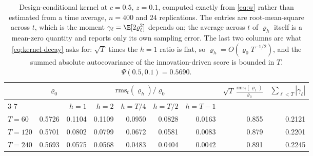 \begin{table}[htbp]
\centering
\caption{Design-conditional kernel at $c=0.5$, $z=0.1$, computed exactly from
\eqref{eq:w} rather than estimated from a time average, $n=400$ and $24$
replications. The entries are root-mean-square across $t$, which is the moment
$\gamma_\ell=\E[2\varrho_\ell^2]$ depends on; the average across $t$ of
$\varrho_h$ itself is a mean-zero quantity and reports only its own sampling
error. The last two columns are what \eqref{eq:kernel-decay} asks for:
$\sqrt T$ times the $h=1$ ratio is flat, so $\varrho_h=O(\varrho_0T^{-1/2})$,
and the summed absolute autocovariance of the innovation-driven score is
bounded in $T$. $\Psi(0.5,0.1)=0.5690$.}
\label{tab:kernel-check}
\small
\begin{tabular}{lrrrrrr@{\qquad}rr}
\toprule
& $\varrho_0$ & \multicolumn{5}{c}{$\mathrm{rms}_t(\varrho_h)/\varrho_0$} & $\sqrt T\,\frac{\mathrm{rms}_t(\varrho_1)}{\varrho_0}$ & $\sum_{\ell<T}|\gamma_\ell|$\\
\cmidrule(lr){3-7}
& & $h=1$ & $h=2$ & $h=T/4$ & $h=T/2$ & $h=T-1$ & & \\
\midrule
$T=60$ & 0.5726 & 0.1104 & 0.1109 & 0.0950 & 0.0828 & 0.0163 & 0.855 & 0.2121 \\
$T=120$ & 0.5701 & 0.0802 & 0.0799 & 0.0672 & 0.0581 & 0.0083 & 0.879 & 0.2201 \\
$T=240$ & 0.5693 & 0.0575 & 0.0568 & 0.0483 & 0.0404 & 0.0042 & 0.891 & 0.2245 \\
\bottomrule
\end{tabular}
\end{table}

